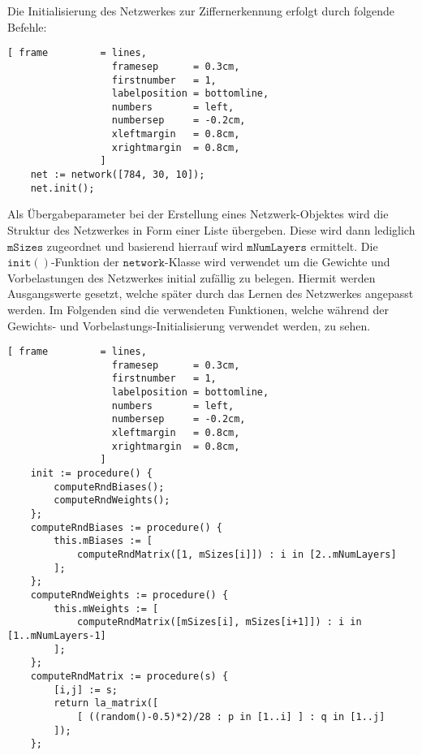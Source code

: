 \noindent
Die Initialisierung des Netzwerkes zur Ziffernerkennung erfolgt durch folgende Befehle:
\begin{Verbatim}[ frame         = lines, 
                  framesep      = 0.3cm, 
                  firstnumber   = 1,
                  labelposition = bottomline,
                  numbers       = left,
                  numbersep     = -0.2cm,
                  xleftmargin   = 0.8cm,
                  xrightmargin  = 0.8cm,
                ]
    net := network([784, 30, 10]);
    net.init();
\end{Verbatim}
Als Übergabeparameter bei der Erstellung eines Netzwerk-Objektes wird die Struktur des Netzwerkes in Form einer Liste übergeben. Diese wird dann lediglich $\mathtt{mSizes}$ zugeordnet und basierend hierrauf wird $\mathtt{mNumLayers}$ ermittelt.
Die $\mathtt{init()}$-Funktion der $\mathtt{network}$-Klasse wird verwendet um die Gewichte und Vorbelastungen des Netzwerkes initial zufällig zu belegen. Hiermit werden Ausgangswerte gesetzt, welche später durch das Lernen des Netzwerkes angepasst werden.
Im Folgenden sind die verwendeten Funktionen, welche während der Gewichts- und Vorbelastungs-Initialisierung verwendet werden, zu sehen.
\begin{Verbatim}[ frame         = lines, 
                  framesep      = 0.3cm, 
                  firstnumber   = 1,
                  labelposition = bottomline,
                  numbers       = left,
                  numbersep     = -0.2cm,
                  xleftmargin   = 0.8cm,
                  xrightmargin  = 0.8cm,
                ]
    init := procedure() {
        computeRndBiases();
        computeRndWeights();
    };
    computeRndBiases := procedure() {
        this.mBiases := [ 
            computeRndMatrix([1, mSizes[i]]) : i in [2..mNumLayers] 
        ];
    };
    computeRndWeights := procedure() {
        this.mWeights := [ 
            computeRndMatrix([mSizes[i], mSizes[i+1]]) : i in [1..mNumLayers-1] 
        ];
    };
    computeRndMatrix := procedure(s) {
        [i,j] := s;
        return la_matrix([
            [ ((random()-0.5)*2)/28 : p in [1..i] ] : q in [1..j]
        ]);
    };
\end{Verbatim}

